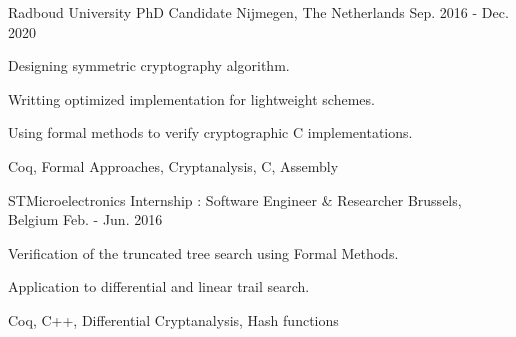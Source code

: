 

\begin{cventries}

  \cventrysix%
    {Radboud University} %
    {PhD Candidate} %
    {Nijmegen, The Netherlands} %
    {Sep. 2016 - Dec. 2020} %
    {
      \begin{cvitems} %
        \item {Designing symmetric cryptography algorithm.} %
        \item {Writting optimized implementation for lightweight schemes.} %
        \item {Using formal methods to verify cryptographic C implementations.} %
      \end{cvitems}
    }%
    {Coq, Formal Approaches, Cryptanalysis, C, Assembly}%

%

  \cventrysix%
    {STMicroelectronics} %
    {Internship : Software Engineer \& Researcher} %
    {Brussels, Belgium} %
    {Feb. - Jun. 2016} %
    {
      \begin{cvitems} %
        \item {Verification of the truncated tree search using Formal Methods.} %
        \item {Application to differential and linear trail search.} %
      \end{cvitems}
    }%
    {Coq, C++, Differential Cryptanalysis, Hash functions}%


\end{cventries}
